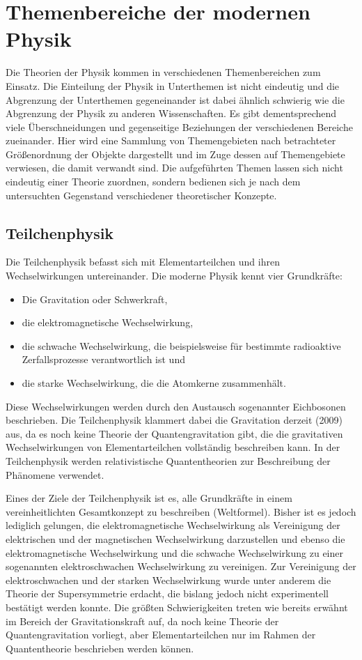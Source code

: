 \documentclass[titlepage, parkskip=full, twocolumn, landscape]{scrartcl}
\begin{document}
\section{Themenbereiche der modernen Physik}

Die Theorien der Physik kommen in verschiedenen Themenbereichen zum Einsatz. Die Einteilung der Physik in Unterthemen ist nicht eindeutig und die Abgrenzung der Unterthemen gegeneinander ist dabei ähnlich schwierig wie die Abgrenzung der Physik zu anderen Wissenschaften. Es gibt dementsprechend viele Überschneidungen und gegenseitige Beziehungen der verschiedenen Bereiche zueinander. Hier wird eine Sammlung von Themengebieten nach betrachteter Größenordnung der Objekte dargestellt und im Zuge dessen auf Themengebiete verwiesen, die damit verwandt sind. Die aufgeführten Themen lassen sich nicht eindeutig einer Theorie zuordnen, sondern bedienen sich je nach dem untersuchten Gegenstand verschiedener theoretischer Konzepte.

\subsection{Teilchenphysik}

Die Teilchenphysik befasst sich mit Elementarteilchen und ihren Wechselwirkungen untereinander. Die moderne Physik kennt vier Grundkräfte:
\begin{itemize}
	\item Die Gravitation oder Schwerkraft,
	\item die elektromagnetische Wechselwirkung,
	\item die schwache Wechselwirkung, die beispielsweise für bestimmte radioaktive Zerfallsprozesse verantwortlich ist und
	\item die starke Wechselwirkung, die die Atomkerne zusammenhält.
\end{itemize}
Diese Wechselwirkungen werden durch den Austausch sogenannter Eichbosonen beschrieben. Die Teilchenphysik klammert dabei die Gravitation derzeit (2009) aus, da es noch keine Theorie der Quantengravitation gibt, die die gravitativen Wechselwirkungen von Elementarteilchen vollständig beschreiben kann. In der Teilchenphysik werden relativistische Quantentheorien zur Beschreibung der Phänomene verwendet.

Eines der Ziele der Teilchenphysik ist es, alle Grundkräfte in einem vereinheitlichten Gesamtkonzept zu beschreiben (Weltformel). Bisher ist es jedoch lediglich gelungen, die elektromagnetische Wechselwirkung als Vereinigung der elektrischen und der magnetischen Wechselwirkung darzustellen und ebenso die elektromagnetische Wechselwirkung und die schwache Wechselwirkung zu einer sogenannten elektroschwachen Wechselwirkung zu vereinigen. Zur Vereinigung der elektroschwachen und der starken Wechselwirkung wurde unter anderem die Theorie der Supersymmetrie erdacht, die bislang jedoch nicht experimentell bestätigt werden konnte. Die größten Schwierigkeiten treten wie bereits erwähnt im Bereich der Gravitationskraft auf, da noch keine Theorie der Quantengravitation vorliegt, aber Elementarteilchen nur im Rahmen der Quantentheorie beschrieben werden können.
\end{document}
